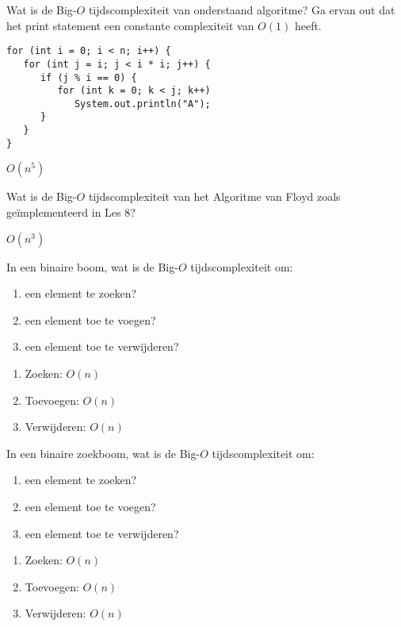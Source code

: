 \begin{oef}
\papier Wat is de Big-\(O\) tijdscomplexiteit van onderstaand algoritme? Ga ervan out dat het print statement een constante complexiteit van \(O(1)\) heeft.

\begin{lstlisting}
for (int i = 0; i < n; i++) {
   for (int j = i; j < i * i; j++) {
      if (j % i == 0) {
         for (int k = 0; k < j; k++)
            System.out.println("A");
      }
   }
}
\end{lstlisting}

\begin{opl}
\(O(n^5)\)
\end{opl}
\end{oef}

\begin{oef}
\papier Wat is de Big-\(O\) tijdscomplexiteit van het Algoritme van Floyd zoals geïmplementeerd in Les 8?

\begin{opl}
\(O(n^3)\)
\end{opl}
\end{oef}

\break

\begin{oef}
\papier In een binaire boom, wat is de Big-\(O\) tijdscomplexiteit om:
\begin{enumerate}
\item een element te zoeken? 
\item een element toe te voegen?
\item een element toe te verwijderen?
\end{enumerate}

\begin{opl}
\begin{enumerate}
\item Zoeken: \(O(n)\)
\item Toevoegen: \(O(n)\) 
\item Verwijderen: \(O(n)\) 
\end{enumerate}
\end{opl}
\end{oef}


\begin{oef}
\papier In een binaire zoekboom, wat is de Big-\(O\) tijdscomplexiteit om:
\begin{enumerate}
\item een element te zoeken? 
\item een element toe te voegen?
\item een element toe te verwijderen?
\end{enumerate}

\begin{opl}
\begin{enumerate}
\item Zoeken: \(O(n)\)
\item Toevoegen: \(O(n)\) 
\item Verwijderen: \(O(n)\) 
\end{enumerate}
\end{opl}
\end{oef}


